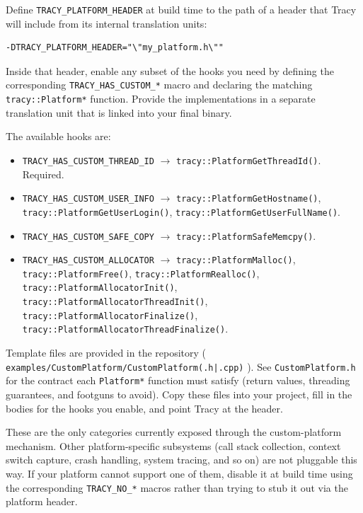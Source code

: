 \documentclass[hidelinks,titlepage,a4paper,twoside]{article}
\begin{document}
Define \texttt{TRACY\_PLATFORM\_HEADER} at build time to the path of a header that Tracy will include from its internal translation units:

\begin{lstlisting}
-DTRACY_PLATFORM_HEADER="\"my_platform.h\""
\end{lstlisting}

Inside that header, enable any subset of the hooks you need by defining the corresponding \texttt{TRACY\_HAS\_CUSTOM\_*} macro and declaring the matching \texttt{tracy::Platform*} function. Provide the implementations in a separate translation unit that is linked into your final binary.

The available hooks are:

\begin{itemize}
\item \texttt{TRACY\_HAS\_CUSTOM\_THREAD\_ID} $\rightarrow$ \texttt{tracy::PlatformGetThreadId()}. Required.
\item \texttt{TRACY\_HAS\_CUSTOM\_USER\_INFO} $\rightarrow$ \texttt{tracy::PlatformGetHostname()}, \texttt{tracy::PlatformGetUserLogin()}, \texttt{tracy::PlatformGetUserFullName()}.
\item \texttt{TRACY\_HAS\_CUSTOM\_SAFE\_COPY} $\rightarrow$ \texttt{tracy::PlatformSafeMemcpy()}.
\item \texttt{TRACY\_HAS\_CUSTOM\_ALLOCATOR} $\rightarrow$ \texttt{tracy::PlatformMalloc()}, \texttt{tracy::PlatformFree()}, \texttt{tracy::PlatformRealloc()}, \texttt{tracy::PlatformAllocatorInit()}, \texttt{tracy::PlatformAllocatorThreadInit()}, \texttt{tracy::PlatformAllocatorFinalize()}, \texttt{tracy::PlatformAllocatorThreadFinalize()}.
\end{itemize}

Template files are provided in the repository ( \texttt{examples/CustomPlatform/CustomPlatform(.h|.cpp)} ). See \texttt{CustomPlatform.h} for the contract each \texttt{Platform*} function must satisfy (return values, threading guarantees, and footguns to avoid). Copy these files into your project, fill in the bodies for the hooks you enable, and point Tracy at the header.

These are the only categories currently exposed through the custom-platform mechanism. Other platform-specific subsystems (call stack collection, context switch capture, crash handling, system tracing, and so on) are not pluggable this way. If your platform cannot support one of them, disable it at build time using the corresponding \texttt{TRACY\_NO\_*} macros rather than trying to stub it out via the platform header.
\end{document}
